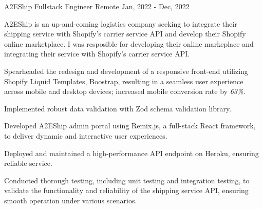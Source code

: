 \cventry
{A2EShip} %
{Fullstack Engineer} %
{Remote}
{Jan, 2022 - Dec, 2022}
{
	A2EShip is an up-and-coming logistics company seeking to integrate their shipping service with Shopify's carrier service API and develop their Shopify online marketplace. I was resposible for developing their online markeplace and integrating their service with Shopify's carrier service API.
	\begin{cvitems} %
		\item {Spearheaded the redesign and development of a responsive front-end utilizing Shopify Liquid Templates, Boostrap, resulting in a seamless user experience across mobile and desktop devices; increased mobile conversion rate by \emph{63\%}.}
		\item {Implemented robust data validation with Zod schema validation library.}
		\item {Developed A2EShip admin portal using Remix.js, a full-stack React framework, to deliver dynamic and interactive user experiences.}
		\item {Deployed and maintained a high-performance API endpoint on Heroku, ensuring reliable service.}
		\item {Conducted thorough testing, including unit testing and integration testing, to validate the functionality and reliability of the shipping service API, ensuring smooth operation under various scenarios.}
	\end{cvitems}
}
